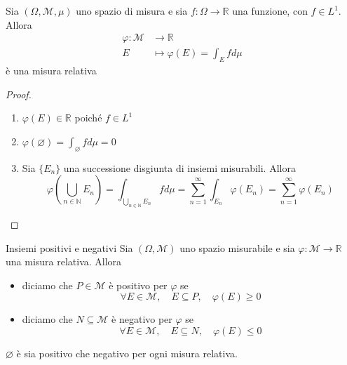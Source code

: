 \begin{proposition}
    Sia \((\Omega, \mathcal{M}, \mu)\) uno spazio di misura e sia \(f : \Omega
    \to \mathbb{R}\) una funzione, con \(f \in L^{1}\). Allora
    \begin{align*}
        \varphi : \mathcal{M} &\longrightarrow \mathbb{R} \\
        E &\longmapsto \varphi (E) = \int_E f d\mu
    \end{align*}
    è una misura relativa
\end{proposition}
\begin{proof} \(\) 
\begin{enumerate}[label = \arabic*.]
    \item \(\varphi(E) \in \mathbb{R}\) poiché \(f \in L^{1}\) 
    \item \(\varphi(\varnothing) = \int_\varnothing f d\mu = 0\)
    \item Sia \(\{E_{n}\} \) una successione disgiunta di insiemi misurabili.
        Allora
        \[
            \varphi\left( \bigcup_{n \in \mathbb{N}} E_{n} \right) =
            \int_{\bigcup_{n \in \mathbb{N}} E_{n} } f d\mu =
            \sum_{n=1}^{\infty} \int_{E_{n}} \varphi(E_{n}) =
            \sum_{n=1}^{\infty} \varphi(E_{n}) 
        \]
\end{enumerate}
\end{proof}

\begin{definition}{Insiemi positivi e negativi}
    Sia \((\Omega, \mathcal{M})\) uno spazio misurabile e sia \(\varphi:
    \mathcal{M} \to  \mathbb{R}\) una misura relativa. Allora 
\begin{itemize}[label = --]
    \item diciamo che \(P \in \mathcal{M}\) è positivo per \(\varphi\) se 
        \[
            \forall E \in \mathcal{M}, \quad E \subseteq P, \quad \varphi(E) \ge
            0
        \]
    \item diciamo che \(N \subseteq \mathcal{M} \) è negativo per \(\varphi\) se 
        \[
            \forall E \in \mathcal{M}, \quad E \subseteq N, \quad \varphi(E) \le
            0
        \]
\end{itemize}
\end{definition}
\begin{remark}
    \(\varnothing\) è sia positivo che negativo per ogni misura relativa.
\end{remark}

